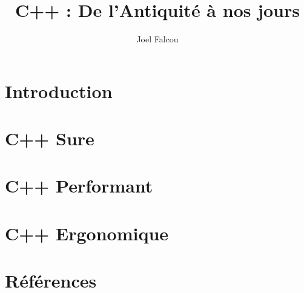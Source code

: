 \documentclass{beamer}
\title{C++ : De l'Antiquité à nos jours}
\author{Joel Falcou}
\institute{Laboratoire de Recherche en Informatique}
\begin{document}
\begin{frame}[plain]
\titlepage
\end{frame}

\section{Introduction}
%

\section{C++ Sure}
%

\section{C++ Performant}
%

\section{C++ Ergonomique}
%

\section{Références}
%
\end{document}
